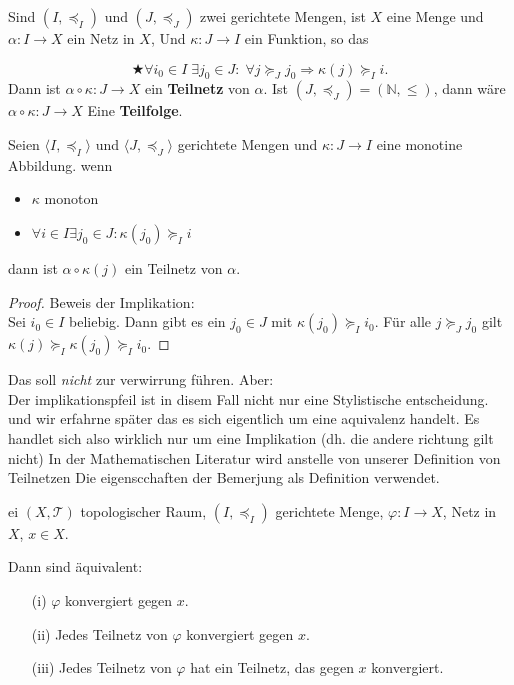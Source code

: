 {
Sind $(I, \preceq_I)$ und $(J, \preceq_J)$ zwei gerichtete Mengen,
ist $X$ eine Menge und $\alpha : I \to X$ ein Netz in $X$, 
Und $\kappa : J \to I$ ein Funktion, so das
 
$$
\bigstar
\forall i_0 \in I \; \exists j_0 \in J : \; \forall j \succeq_J j_0
\Rightarrow \kappa(j) \succeq_I i .
$$
Dann ist $\alpha \circ \kappa : J \to X$ ein \textbf{Teilnetz} von $\alpha$.
Ist $(J, \preceq_J) = (\mathbb{N}, \leq)$, 
dann wäre $\alpha \circ \kappa : J \to X$ Eine \textbf{Teilfolge}.
}
\nt
{ 
    Seien $\langle I, \preceq_I \rangle$ und $\langle J, \preceq_J \rangle$ 
    gerichtete Mengen und $\kappa : J \to I$ eine monotine Abbildung.
    wenn 
    \begin{itemize}
        \item $\kappa$ monoton
        \item $\forall i \in I \exists j_0 \in J: \kappa(j_0) \succeq_I i$
    \end{itemize}
    dann ist $\alpha \circ \kappa(j) $ ein Teilnetz von $\alpha$.

    \begin{proof}{Beweis der Implikation:}\\
        Sei $i_0 \in I$ beliebig. Dann gibt es ein $j_0 \in J$ mit 
        $\kappa(j_0) \succeq_I i_0$. Für alle $j \succeq_J j_0$ gilt
        $\kappa(j) \succeq_I \kappa(j_0) \succeq_I i_0$.
    \end{proof}
}

Das soll \emph{nicht} zur verwirrung führen. Aber:\\
Der implikationspfeil ist in disem Fall nicht nur eine Stylistische entscheidung.
und wir erfahrne später das es sich eigentlich um eine aquivalenz handelt. 
Es handlet sich also wirklich nur um eine Implikation (dh. die andere richtung
gilt nicht) 
In der Mathematischen Literatur wird anstelle von unserer 
Definition von Teilnetzen
Die eigenscchaften der Bemerjung als Definition verwendet.

\thm{}
{
    ei $(X, \mathcal{T})$ topologischer Raum, $(I, \preceq_I)$ gerichtete Menge,  
$\varphi : I \to X$, Netz in $X$, $x \in X$.  

Dann sind äquivalent:

\begin{enumerate}
\item[(i)] $\varphi$ konvergiert gegen $x$.
\item[(ii)] Jedes Teilnetz von $\varphi$ konvergiert gegen $x$.
\item[(iii)] Jedes Teilnetz von $\varphi$ hat ein Teilnetz, das gegen $x$ konvergiert.
\end{enumerate}
}

